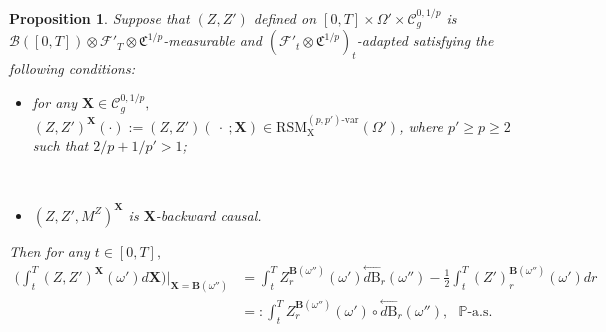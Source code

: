 \documentclass[11pt,reqno]{amsart}
\newtheorem{proposition}[lemma]{Proposition}
\newcommand{\BX}{{\mathbf{X}}}
\newcommand{\BB}{{\mathbf{B}}}
\newcommand{\MF}{{\mathcal{F}}}
\numberwithin{equation}{section}
\def\PP{{\mathbb P}}
\begin{document}
\begin{proposition}\label{prop:backward-equiv} 
Suppose that $(Z,Z')$ defined on $ [0,T] \times \Omega' \times \mathscr{C}^{0,1/p}_g  $ is $\mathcal B([0,T]) \otimes \MF'_T \otimes \mathfrak C^{1/p}$-measurable and $(\MF'_t \otimes \mathfrak C^{1/p})_t$-adapted satisfying the following conditions:
\begin{itemize}
\item[(1)] for any $\BX  \in \mathscr{C}^{0,1/p}_g,$ $(Z,Z')^{\BX}(\cdot):= (Z,Z')(\ \cdot \ ; \BX)   \in \mathrm{RSM}^{(p,p')\text{-}\mathrm{var}}_{\mathrm X}(\Omega')$, where $p' \ge p \ge 2$ such that \( 2/p+ 1/{p'}>1\);

\

\item[(2)] $(Z, Z', M^Z)^{\BX}$ is $\BX$-{\it backward causal}.
\end{itemize}
Then for any $t\in[0,T],$ 
\begin{equation}\label{eq:rough=ito} 
\begin{split}
\Big(  \int_t^T (Z, Z')^{\mathbf{X}} (\omega') d
\mathbf{X} \Big)   \bigg|_{\mathbf{X} = \mathbf{B} (\omega'')} 
&= \int_t^T Z^{\mathbf{B} (\omega'')}_r (\omega')   \overset{\leftarrow}{d \mathrm B}_r (\omega'') - \frac{1}{2} \int_t^T (Z')^{\BB(\omega'')}_r(\omega') dr\\
&=: \int_t^T Z^{\mathbf{B} (\omega'')}_r (\omega') \circ \overset{\leftarrow}{d \mathrm B}_r (\omega''), \ \ \ \PP\text{-a.s.}
\end{split}
\end{equation}



\end{proposition}
\end{document}
